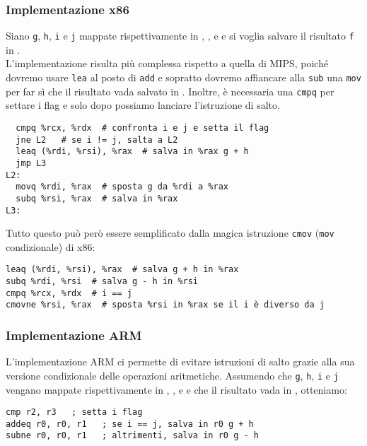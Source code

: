 \documentclass[class=book, crop=false, oneside]{standalone}
\begin{document}
\subsubsection{Implementazione x86}
Siano \texttt{g}, \texttt{h}, \texttt{i} e \texttt{j} mappate rispettivamente in , ,  e  e si voglia salvare il risultato \texttt{f} in .\\
L'implementazione risulta più complessa rispetto a quella di MIPS, poiché dovremo usare \texttt{lea} al posto di \texttt{add} e sopratto dovremo affiancare alla \texttt{sub} una \texttt{mov} per far sì che il risultato vada salvato in . Inoltre, è necessaria una \texttt{cmpq} per settare i flag e solo dopo possiamo lanciare l'istruzione di salto.
\begin{verbatim}
  cmpq %rcx, %rdx  # confronta i e j e setta il flag
  jne L2   # se i != j, salta a L2
  leaq (%rdi, %rsi), %rax  # salva in %rax g + h
  jmp L3
L2:
  movq %rdi, %rax  # sposta g da %rdi a %rax
  subq %rsi, %rax  # salva in %rax
L3:
\end{verbatim}
Tutto questo può però essere semplificato dalla magica istruzione \texttt{cmov} (\texttt{mov} condizionale) di x86:
\begin{verbatim}
leaq (%rdi, %rsi), %rax  # salva g + h in %rax
subq %rdi, %rsi  # salva g - h in %rsi
cmpq %rcx, %rdx  # i == j
cmovne %rsi, %rax  # sposta %rsi in %rax se il i è diverso da j
\end{verbatim}

\subsubsection{Implementazione ARM}
L'implementazione ARM ci permette di evitare istruzioni di salto grazie alla sua versione condizionale delle operazioni aritmetiche. Assumendo che \texttt{g}, \texttt{h}, \texttt{i} e \texttt{j} vengano mappate rispettivamente in , ,  e  e che il risultato vada in , otteniamo:
\begin{verbatim}
cmp r2, r3   ; setta i flag
addeq r0, r0, r1   ; se i == j, salva in r0 g + h
subne r0, r0, r1   ; altrimenti, salva in r0 g - h
\end{verbatim}
\end{document}
